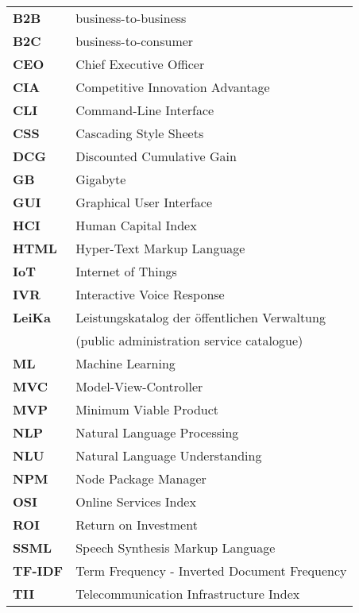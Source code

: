 \begin{flushleft}
\begin{tabular}{ll}
\textbf{B2B}				&	business-to-business\\
\textbf{B2C}				&	business-to-consumer\\

\textbf{CEO}	&	Chief Executive Officer\\
\textbf{CIA}	&	Competitive Innovation Advantage\\
\textbf{CLI}	&	Command-Line Interface\\
\textbf{CSS}	&	Cascading Style Sheets\\

\textbf{DCG}	&	Discounted Cumulative Gain\\

\textbf{GB}	&	Gigabyte\\
\textbf{GUI}	&	Graphical User Interface\\

\textbf{HCI}	&	Human Capital Index\\
\textbf{HTML}	&	Hyper-Text Markup Language\\

\textbf{IoT}	&	Internet of Things\\
\textbf{IVR}	&	Interactive Voice Response\\

\textbf{LeiKa}	&	Leistungskatalog der öffentlichen Verwaltung \\
& (public administration service catalogue)\\


\textbf{ML}		&	Machine Learning\\
\textbf{MVC}	&	Model-View-Controller\\
\textbf{MVP}	&	Minimum Viable Product\\

\textbf{NLP}	&	Natural Language Processing\\
\textbf{NLU}	&	Natural Language Understanding\\
\textbf{NPM}	&	Node Package Manager\\

\textbf{OSI}	&	Online Services Index\\
\textbf{ROI}	&	Return on Investment\\
\textbf{SSML}	&	Speech Synthesis Markup Language\\

\textbf{TF-IDF}	&	Term Frequency - Inverted Document Frequency\\
\textbf{TII}	&	Telecommunication Infrastructure Index\\


\end{tabular}
\end{flushleft}
